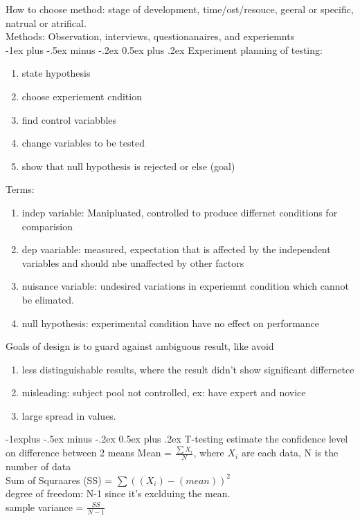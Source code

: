 \documentclass[10pt,landscape]{article}
\makeatletter
\renewcommand{\section}{\@startsection{section}{1}{0mm}%
                                {-1ex plus -.5ex minus -.2ex}%
                                {0.5ex plus .2ex}%
                                {\normalfont\large\bfseries}}
\renewcommand{\subsection}{\@startsection{subsection}{2}{0mm}%
                                {-1explus -.5ex minus -.2ex}%
                                {0.5ex plus .2ex}%
                                {\normalfont\normalsize\bfseries}}
\theoremstyle{definition}
\makeatother
\begin{document}
\begin{multicols}{3}
How to choose method: stage of development, time/ost/resouce, geeral or specific, natrual or atrifical. \\
Methods: Observation, interviews, questionanaires, and experiemnts \\



\section{Experiment}
planning of testing:
\begin{enumerate}
    \item state hypothesis
    \item choose experiement cndition
    \item find control variabbles
    \item change variables to be tested
    \item show that null hypothesis is rejected or else (goal)
\end{enumerate}

Terms: \\
\begin{enumerate}
    \item indep variable: Manipluated, controlled to produce differnet conditions for comparision
    \item dep vaariable: measured, expectation that is affected by the independent variables and should nbe unaffected by other factors
    \item nuisance variable: undesired variations in experiemnt condition which cannot be elimated. 
    \item null hypothesis: experimental condition have no effect on performance
\end{enumerate}

Goals of design is to guard against ambiguous result, like avoid 
\begin{enumerate}
    \item less distinguishable results, where the result didn't show significant differnetce
    \item misleading: subject pool not controlled, ex: have expert and novice
    \item large spread in values.
\end{enumerate}

\subsection{T-testing}
estimate the confidence level on difference between 2 means
Mean = $\frac{\sum X_i}{N}$, where $X_i$ are each data, N is the number of data \\
Sum of Squraares (SS) = $\sum ((X_i) - (mean))^2$ \\
degree of freedom: N-1 since it's exclduing the mean.  \\
sample variance = $\frac{SS}{N-1}$ \\


\end{multicols}
\end{document}
